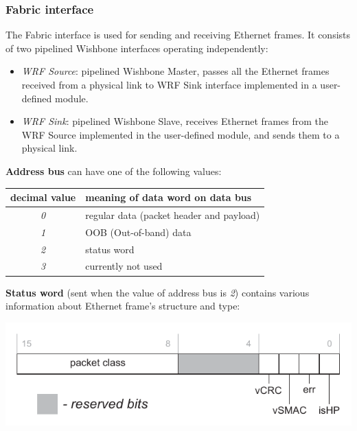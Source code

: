 \subsubsection{Fabric interface}
\label{sec:wrpc_fabric}

The Fabric interface is used for sending and receiving Ethernet frames. It consists 
of two pipelined Wishbone interfaces operating independently: 

\begin{itemize}
  \item \emph{WRF Source}: pipelined Wishbone Master, passes all the Ethernet frames
    received from a physical link to WRF Sink interface implemented in a
    user-defined module.
  \item \emph{WRF Sink}: pipelined Wishbone Slave, receives Ethernet frames from
    the WRF Source implemented in the user-defined module, and sends them to a
    physical link.
\end{itemize}

{\bf Address bus} can have one of the following values:

\begin{center}
\begin{tabular}{|c|l|}
  \hline {\bf decimal value} & {\bf meaning of data word on data bus}\\
  \hline
  \emph{0} & regular data (packet header and payload)\\
  \emph{1} & OOB (Out-of-band) data\\
  \emph{2} & status word\\
  \emph{3} & currently not used\\
  \hline
\end{tabular}
\end{center}

{\bf Status word} (sent when the value of address bus is \emph{2}) contains
various information about Ethernet frame's structure and type:
  \begin{center}
    \includegraphics[width=.6\textwidth]{fig/status.pdf}
  \end{center}

